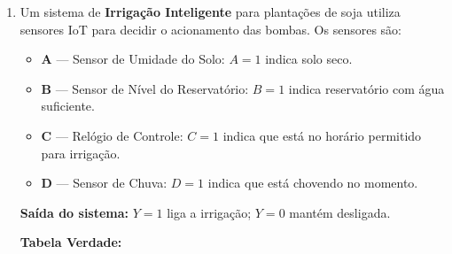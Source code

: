 \documentclass[12pt,a4paper]{article}
\begin{document}
\begin{enumerate}
    Assinale a alternativa que indica quais afirmações estão corretas:

    \begin{enumerate}[label=\Alph*)]
        \item Apenas as afirmações I e II estão corretas.
        \item Apenas as afirmações I e III estão corretas.
        \item Apenas as afirmações II e IV estão corretas.
        \item Apenas as afirmações III e IV estão corretas.
        \item Todas as afirmações estão corretas.
    \end{enumerate}

    \item Um sistema de \textbf{Irrigação Inteligente} para plantações de soja utiliza sensores IoT para decidir o acionamento das bombas. Os sensores são:
    
    \begin{itemize}[leftmargin=1cm, label=\textbullet]
      \item \textbf{A} — Sensor de Umidade do Solo: $A = 1$ indica solo seco.
      \item \textbf{B} — Sensor de Nível do Reservatório: $B = 1$ indica reservatório com água suficiente.
      \item \textbf{C} — Relógio de Controle: $C = 1$ indica que está no horário permitido para irrigação.
      \item \textbf{D} — Sensor de Chuva: $D = 1$ indica que está chovendo no momento.
    \end{itemize}
    
    \textbf{Saída do sistema:} $Y = 1$ liga a irrigação; $Y = 0$ mantém desligada.
    
    \noindent\textbf{Tabela Verdade:}
    

\end{enumerate}
\end{document}
